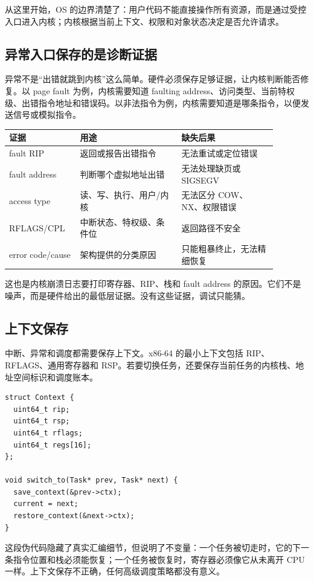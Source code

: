 从这里开始，OS 的边界清楚了：用户代码不能直接操作所有资源，而是通过受控入口进入内核；内核根据当前上下文、权限和对象状态决定是否允许请求。

\subsection{异常入口保存的是诊断证据}

异常不是“出错就跳到内核”这么简单。硬件必须保存足够证据，让内核判断能否修复。以 page fault 为例，内核需要知道 faulting address、访问类型、当前特权级、出错指令地址和错误码。以非法指令为例，内核需要知道是哪条指令，以便发送信号或模拟指令。

\begin{longtable}{p{0.22\linewidth}p{0.34\linewidth}p{0.32\linewidth}}
\toprule
证据 & 用途 & 缺失后果 \\
\midrule
fault RIP & 返回或报告出错指令 & 无法重试或定位错误 \\
fault address & 判断哪个虚拟地址出错 & 无法处理缺页或 SIGSEGV \\
access type & 读、写、执行、用户/内核 & 无法区分 COW、NX、权限错误 \\
RFLAGS/CPL & 中断状态、特权级、条件位 & 返回路径不安全 \\
error code/cause & 架构提供的分类原因 & 只能粗暴终止，无法精细恢复 \\
\bottomrule
\end{longtable}

这也是内核崩溃日志要打印寄存器、RIP、栈和 fault address 的原因。它们不是噪声，而是硬件给出的最低层证据。没有这些证据，调试只能猜。

\subsection{上下文保存}

中断、异常和调度都需要保存上下文。x86-64 的最小上下文包括 RIP、RFLAGS、通用寄存器和 RSP。若要切换任务，还要保存当前任务的内核栈、地址空间标识和调度账本。

\begin{lstlisting}
struct Context {
  uint64_t rip;
  uint64_t rsp;
  uint64_t rflags;
  uint64_t regs[16];
};

void switch_to(Task* prev, Task* next) {
  save_context(&prev->ctx);
  current = next;
  restore_context(&next->ctx);
}
\end{lstlisting}

这段伪代码隐藏了真实汇编细节，但说明了不变量：一个任务被切走时，它的下一条指令位置和栈必须能恢复；一个任务被恢复时，寄存器必须像它从未离开 CPU 一样。上下文保存不正确，任何高级调度策略都没有意义。

